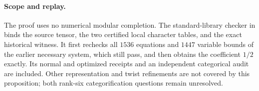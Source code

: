 \paragraph{Scope and replay.}
The proof uses no numerical modular completion. The standard-library
checker in
binds the source tensor, the two certified local character tables, and
the exact historical witness. It first rechecks all $1536$ equations
and $1447$ variable bounds of the earlier necessary system, which still
pass, and then obtains the coefficient $1/2$ exactly. Its normal and
optimized receipts and an independent categorical audit are included.
Other representation and twist refinements are not covered by this
proposition; both rank-six categorification questions remain unresolved.
